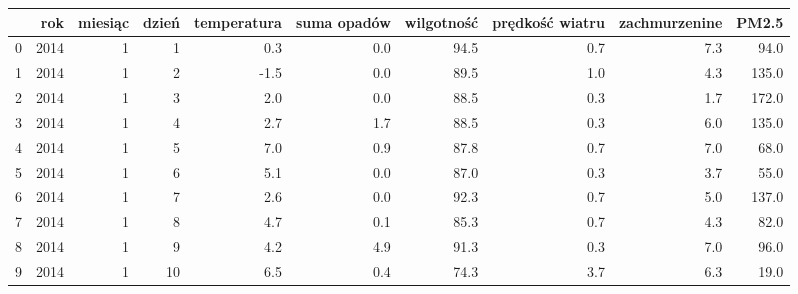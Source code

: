 \begin{tabular}{lrrrrrrrrr}
\toprule
 & rok & miesiąc & dzień & temperatura & suma opadów & wilgotność & prędkość wiatru & zachmurzenine & PM2.5 \\
\midrule
0 & 2014 & 1 & 1 & 0.3 & 0.0 & 94.5 & 0.7 & 7.3 & 94.0 \\
1 & 2014 & 1 & 2 & -1.5 & 0.0 & 89.5 & 1.0 & 4.3 & 135.0 \\
2 & 2014 & 1 & 3 & 2.0 & 0.0 & 88.5 & 0.3 & 1.7 & 172.0 \\
3 & 2014 & 1 & 4 & 2.7 & 1.7 & 88.5 & 0.3 & 6.0 & 135.0 \\
4 & 2014 & 1 & 5 & 7.0 & 0.9 & 87.8 & 0.7 & 7.0 & 68.0 \\
5 & 2014 & 1 & 6 & 5.1 & 0.0 & 87.0 & 0.3 & 3.7 & 55.0 \\
6 & 2014 & 1 & 7 & 2.6 & 0.0 & 92.3 & 0.7 & 5.0 & 137.0 \\
7 & 2014 & 1 & 8 & 4.7 & 0.1 & 85.3 & 0.7 & 4.3 & 82.0 \\
8 & 2014 & 1 & 9 & 4.2 & 4.9 & 91.3 & 0.3 & 7.0 & 96.0 \\
9 & 2014 & 1 & 10 & 6.5 & 0.4 & 74.3 & 3.7 & 6.3 & 19.0 \\
\bottomrule
\end{tabular}
